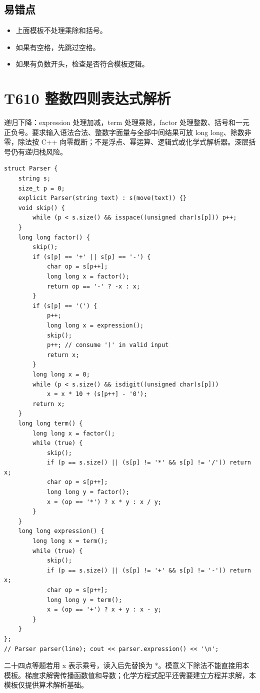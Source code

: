 \subsection{易错点}

\begin{itemize}
  \item 上面模板不处理乘除和括号。
  \item 如果有空格，先跳过空格。
  \item 如果有负数开头，检查是否符合模板逻辑。
\end{itemize}

\section{T610 整数四则表达式解析}\label{sec:09-50}\label{tpl:610}
递归下降：expression 处理加减，term 处理乘除，factor 处理整数、括号和一元正负号。要求输入语法合法、整数字面量与全部中间结果可放 long long、除数非零，除法按 C++ 向零截断；不是浮点、幂运算、逻辑式或化学式解析器。深层括号仍有递归栈风险。
\begin{lstlisting}
struct Parser {
    string s;
    size_t p = 0;
    explicit Parser(string text) : s(move(text)) {}
    void skip() {
        while (p < s.size() && isspace((unsigned char)s[p])) p++;
    }
    long long factor() {
        skip();
        if (s[p] == '+' || s[p] == '-') {
            char op = s[p++];
            long long x = factor();
            return op == '-' ? -x : x;
        }
        if (s[p] == '(') {
            p++;
            long long x = expression();
            skip();
            p++; // consume ')' in valid input
            return x;
        }
        long long x = 0;
        while (p < s.size() && isdigit((unsigned char)s[p]))
            x = x * 10 + (s[p++] - '0');
        return x;
    }
    long long term() {
        long long x = factor();
        while (true) {
            skip();
            if (p == s.size() || (s[p] != '*' && s[p] != '/')) return x;
            char op = s[p++];
            long long y = factor();
            x = (op == '*') ? x * y : x / y;
        }
    }
    long long expression() {
        long long x = term();
        while (true) {
            skip();
            if (p == s.size() || (s[p] != '+' && s[p] != '-')) return x;
            char op = s[p++];
            long long y = term();
            x = (op == '+') ? x + y : x - y;
        }
    }
};
// Parser parser(line); cout << parser.expression() << '\n';
\end{lstlisting}
二十四点等题若用 x 表示乘号，读入后先替换为 *。模意义下除法不能直接用本模板。梯度求解需传播函数值和导数；化学方程式配平还需要建立方程并求解，本模板仅提供算术解析基础。
